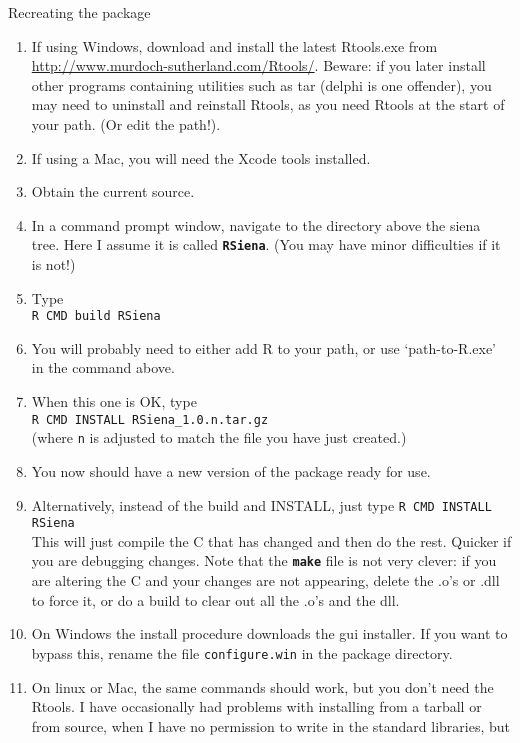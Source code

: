 \documentclass[12pt, a4paper]{article}
\makeatletter
\renewcommand{\=}{\,=\,}
\newcommand{\+}{\,+\,}
\newcommand{\sfn}[1]{\textbf{\texttt{#1}}}
\renewcommand{\section}{\@startsection{section}{1}
                {0pt}{\baselineskip}{0.5\baselineskip}
                {\centering\sffamily} }
\makeatother
\begin{document}
\section{Recreating the package}
\begin{enumerate}
\item If using Windows, download and install the latest
\textsf{Rtools.exe} from
  \url{http://www.murdoch-sutherland.com/Rtools/}.  Beware: if you later install
  other programs containing utilities such as tar (delphi is one offender), you
  may need to uninstall and reinstall Rtools, as you need Rtools at the start of
  your path. (Or edit the path!).
\item If using a Mac, you will need the Xcode tools installed.
\item Obtain the current source.
\item In a command prompt window, navigate to the directory above the siena
  tree. Here I assume it is called \sfn{RSiena}. (You may have minor
  difficulties if it is not!)
\item Type\\
\verb|R CMD build RSiena|
\item You will probably need to either add R to your path, or use
  `path-to-R.exe' in the command above.
\item When this one is OK, type\\
\verb|R CMD INSTALL RSiena_1.0.n.tar.gz|\\
(where \verb|n| is adjusted to match the file you have just created.)
\item You now should have a new version of the package ready for use.
\item Alternatively, instead of the build and INSTALL, just type
\verb|R CMD INSTALL RSiena|\\
This will just compile the C that has changed and then do the rest.
Quicker if you are debugging changes. Note that the \sfn{make} file is not very
clever: if you are altering the C and your changes are not appearing, delete the
.o's or .dll to force it, or do a build
to clear out all the .o's and the dll.
\item On Windows the install procedure downloads the gui installer. If you want
  to bypass this, rename the file \verb|configure.win| in the package
  directory. 
\item On linux or Mac, the same commands should work, but you don't need the
  Rtools. I have occasionally had problems with installing from a tarball or
  from source, when I have no permission to write in the standard libraries, but

\end{enumerate}
\end{document}
